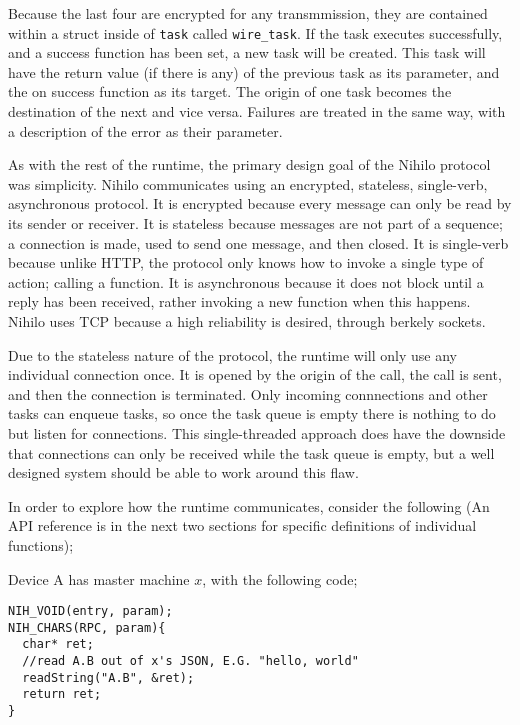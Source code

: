 \documentclass{article}
\begin{document}
Because the last four are encrypted for any transmmission, they are contained within a struct inside of \texttt{task} called \texttt{wire\_task}. If the task executes successfully, and a success function has been set, a new task will be created. This task will have the return value (if there is any) of the previous task as its parameter, and the on success function as its target. The origin of one task becomes the destination of the next and vice versa.  Failures are treated in the same way, with a description of the error as their parameter.

As with the rest of the runtime, the primary design goal of the Nihilo protocol was simplicity. Nihilo communicates using an encrypted, stateless, single-verb, asynchronous protocol. It is encrypted because every message can only be read by its sender or receiver. It is stateless because messages are not part of a sequence; a connection is made, used to send one message, and then closed. It is single-verb because unlike HTTP, the protocol only knows how to invoke a single type of action; calling a function. It is asynchronous because it does not block until a reply has been received, rather invoking a new function when this happens. Nihilo uses TCP because a high reliability is desired, through berkely sockets.

Due to the stateless nature of the protocol, the runtime will only use any individual connection once. It is opened by the origin of the call, the call is sent, and then the connection is terminated. Only incoming connnections and other tasks can enqueue tasks, so once the task queue is empty there is nothing to do but listen for connections. This single-threaded approach does have the downside that connections can only be received while the task queue is empty, but a well designed system should be able to work around this flaw.

In order to explore how the runtime communicates, consider the following (An API reference is in the next two sections for specific definitions of individual functions);

Device A has master machine \( x \), with the following code;
\begin{tcolorbox}[colback=white,grow to left by=2.5mm,grow to right by=2.5mm,left*=0mm,right*=0mm,sharp corners]
\begin{verbatim}
NIH_VOID(entry, param);
NIH_CHARS(RPC, param){
  char* ret;
  //read A.B out of x's JSON, E.G. "hello, world"
  readString("A.B", &ret);
  return ret;
}
\end{verbatim}
\end{tcolorbox}
\end{document}
